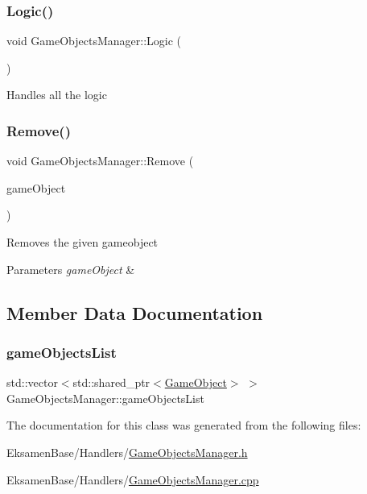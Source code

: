 \subsubsection{\texorpdfstring{Logic()}{Logic()}}
{\footnotesize\ttfamily void Game\+Objects\+Manager\+::\+Logic (\begin{DoxyParamCaption}{ }\end{DoxyParamCaption})}



Handles all the logic 

\mbox{\label{class_game_objects_manager_a1aff7fa8c420de210baffadf2e2be703}} 
\subsubsection{\texorpdfstring{Remove()}{Remove()}}
{\footnotesize\ttfamily void Game\+Objects\+Manager\+::\+Remove (\begin{DoxyParamCaption}\item[{std\+::shared\+\_\+ptr$<$ \mbox{\hyperlink{class_game_object}{Game\+Object}} $>$}]{game\+Object }\end{DoxyParamCaption})}



Removes the given gameobject 


\begin{DoxyParams}{Parameters}
{\em game\+Object} & \\
\hline
\end{DoxyParams}


\subsection{Member Data Documentation}
\mbox{\label{class_game_objects_manager_a9abd27653014d01700f60391041b6bb8}} 
\subsubsection{\texorpdfstring{game\+Objects\+List}{gameObjectsList}}
{\footnotesize\ttfamily std\+::vector$<$std\+::shared\+\_\+ptr$<$\mbox{\hyperlink{class_game_object}{Game\+Object}}$>$ $>$ Game\+Objects\+Manager\+::game\+Objects\+List}



The documentation for this class was generated from the following files\+:\begin{DoxyCompactItemize}
\item 
Eksamen\+Base/\+Handlers/\mbox{\hyperlink{_game_objects_manager_8h}{Game\+Objects\+Manager.\+h}}\item 
Eksamen\+Base/\+Handlers/\mbox{\hyperlink{_game_objects_manager_8cpp}{Game\+Objects\+Manager.\+cpp}}\end{DoxyCompactItemize}

